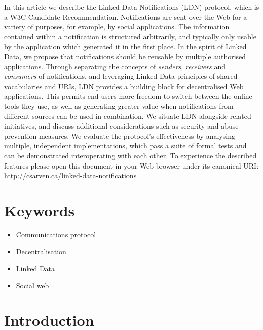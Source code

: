 \documentclass[a4paper]{llncs}
\begin{document}
                          
\par In this article we describe the Linked Data Notifications (LDN) protocol, which is a \empty W3C Candidate Recommendation. Notifications are sent over the Web for a variety of purposes, for example, by social applications. The information contained within a notification is structured arbitrarily, and typically only usable by the application which generated it in the first place. In the spirit of Linked Data, we propose that notifications should be reusable by multiple authorised applications. Through separating the concepts of {\em senders}, {\em receivers} and {\em consumers} of notifications, and leveraging Linked Data principles of shared vocabularies and URIs, LDN provides a building block for decentralised Web applications. This permits end users more freedom to switch between the online tools they use, as well as generating greater value when notifications from different sources can be used in combination. We situate LDN alongside related initiatives, and discuss additional considerations such as security and abuse prevention measures. We evaluate the protocol’s effectiveness by analysing multiple, independent implementations, which pass a suite of formal tests and can be demonstrated interoperating with each other. To experience the described features please open this document in your Web browser under its canonical URI: http://csarven.ca/linked-data-notifications
                        
                    

                    
                        \section{Keywords}
  \label{keywords}

                        
                            \begin{itemize}
  \item \empty Communications protocol\item \empty Decentralisation\item \empty Linked Data\item \empty Social web
    \end{itemize}
  
                        
                    

                    
                        \section{Introduction}
  \label{introduction}
\end{document}
